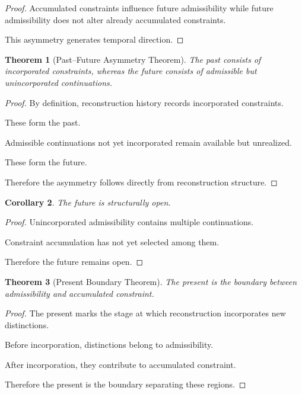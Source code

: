 \documentclass[12pt,oneside]{article}
\newtheorem{theorem}{Theorem}[section] \newtheorem{lemma}[theorem]{Lemma} \newtheorem{proposition}[theorem]{Proposition} \newtheorem{corollary}[theorem]{Corollary}
\theoremstyle{definition}
\begin{document}
\begin{proof}

Accumulated constraints influence future admissibility while future admissibility does not alter already accumulated constraints.

This asymmetry generates temporal direction.

\end{proof}

\begin{theorem}[Past–Future Asymmetry Theorem]

The past consists of incorporated constraints, whereas the future consists of admissible but unincorporated continuations.

\end{theorem}

\begin{proof}

By definition, reconstruction history records incorporated constraints.

These form the past.

Admissible continuations not yet incorporated remain available but unrealized.

These form the future.

Therefore the asymmetry follows directly from reconstruction structure.

\end{proof}

\begin{corollary}

The future is structurally open.

\end{corollary}

\begin{proof}

Unincorporated admissibility contains multiple continuations.

Constraint accumulation has not yet selected among them.

Therefore the future remains open.

\end{proof}

\begin{theorem}[Present Boundary Theorem]

The present is the boundary between admissibility and accumulated constraint.

\end{theorem}

\begin{proof}

The present marks the stage at which reconstruction incorporates new distinctions.

Before incorporation, distinctions belong to admissibility.

After incorporation, they contribute to accumulated constraint.

Therefore the present is the boundary separating these regions.

\end{proof}
\end{document}
